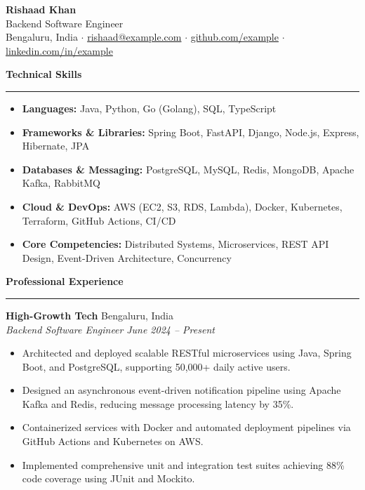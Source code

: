 \documentclass[11pt,a4paper]{article}
\begin{document}
\begin{center}
    {\LARGE \textbf{Rishaad Khan}}\\[4pt]
    Backend Software Engineer\\[4pt]
    Bengaluru, India $\cdot$ \href{mailto:rishaad@example.com}{rishaad@example.com} $\cdot$ \href{https://github.com/example}{github.com/example} $\cdot$ \href{https://linkedin.com/in/example}{linkedin.com/in/example}
\end{center}

\vspace{6pt}

\noindent\textbf{\large Technical Skills}
\vspace{2pt}
\hrule
\vspace{4pt}
\begin{itemize}[leftmargin=1.5em, itemsep=2pt]
    \item \textbf{Languages:} Java, Python, Go (Golang), SQL, TypeScript
    \item \textbf{Frameworks \& Libraries:} Spring Boot, FastAPI, Django, Node.js, Express, Hibernate, JPA
    \item \textbf{Databases \& Messaging:} PostgreSQL, MySQL, Redis, MongoDB, Apache Kafka, RabbitMQ
    \item \textbf{Cloud \& DevOps:} AWS (EC2, S3, RDS, Lambda), Docker, Kubernetes, Terraform, GitHub Actions, CI/CD
    \item \textbf{Core Competencies:} Distributed Systems, Microservices, REST API Design, Event-Driven Architecture, Concurrency
\end{itemize}

\vspace{6pt}

\noindent\textbf{\large Professional Experience}
\vspace{2pt}
\hrule
\vspace{4pt}

\noindent\textbf{High-Growth Tech} \hfill Bengaluru, India\\
\textit{Backend Software Engineer} \hfill \textit{June 2024 -- Present}
\begin{itemize}[leftmargin=1.5em, itemsep=2pt]
    \item Architected and deployed scalable RESTful microservices using Java, Spring Boot, and PostgreSQL, supporting 50,000+ daily active users.
    \item Designed an asynchronous event-driven notification pipeline using Apache Kafka and Redis, reducing message processing latency by 35\%.
    \item Containerized services with Docker and automated deployment pipelines via GitHub Actions and Kubernetes on AWS.
    \item Implemented comprehensive unit and integration test suites achieving 88\% code coverage using JUnit and Mockito.
\end{itemize}
\end{document}
